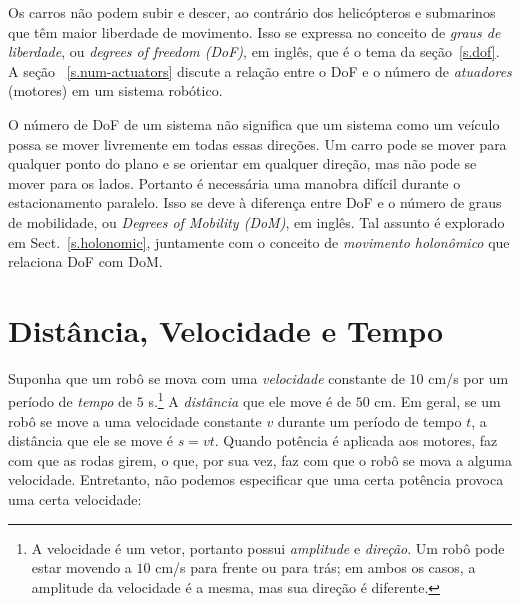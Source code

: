 Os carros não podem subir e descer, ao contrário dos helicópteros e submarinos que têm maior liberdade de movimento. Isso se expressa no conceito de \emph{graus de liberdade}, ou \emph{degrees of freedom (DoF)}, em inglês, que é o tema da seção~\ref{s.dof}. A seção ~\ref{s.num-actuators} discute a relação entre o DoF e o número de \emph{atuadores} (motores) em um sistema robótico.

O número de DoF de um sistema não significa que um sistema como um veículo possa se mover livremente em todas essas direções. Um carro pode se mover para qualquer ponto do plano e se orientar em qualquer direção, mas não pode se mover para os lados. Portanto é necessária uma manobra difícil durante o estacionamento paralelo. Isso se deve à diferença entre DoF e o número de graus de mobilidade, ou \emph{Degrees of Mobility (DoM)}, em inglês. Tal assunto é explorado em Sect.~\ref{s.holonomic}, juntamente com o conceito de \emph{movimento holonômico} que relaciona  DoF com DoM.

\section{Distância, Velocidade e Tempo}\label{s.distance-velocity}

Suponha que um robô se mova com uma \emph{velocidade} constante de $10$ cm/s por um período de \emph{tempo} de $5$ s.\footnote{A velocidade é um vetor, portanto possui \emph{amplitude} e \emph{direção}. Um robô pode estar movendo a $10$ cm/s para frente ou para trás; em ambos os casos, a amplitude da velocidade é a mesma, mas sua direção é diferente.}
A \emph{distância} que ele move é de $50$ cm. Em geral, se um robô se move a uma velocidade constante $v$ durante um período de tempo $t$, a distância que ele se move é $s=vt$. Quando potência é aplicada aos motores, faz com que as rodas girem, o que, por sua vez, faz com que o robô se mova a alguma velocidade. Entretanto, não podemos especificar que uma certa potência provoca uma certa velocidade:

